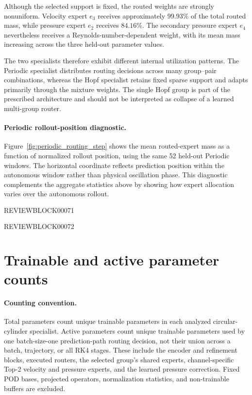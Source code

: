 \documentclass{article}
\begin{document}
Although the selected support is fixed, the routed weights are strongly nonuniform. Velocity expert $e_3$ receives approximately $99.93\%$ of the total routed mass, while pressure expert $e_2$ receives $84.16\%$. The secondary pressure expert $e_4$ nevertheless receives a Reynolds-number-dependent weight, with its mean mass increasing across the three held-out parameter values.

The two specialists therefore exhibit different internal utilization patterns. The Periodic specialist distributes routing decisions across many group--pair combinations, whereas the Hopf specialist retains fixed sparse support and adapts primarily through the mixture weights. The single Hopf group is part of the prescribed architecture and should not be interpreted as collapse of a learned multi-group router.

\paragraph{Periodic rollout-position diagnostic.}
Figure~\ref{fig:periodic_routing_step} shows the mean routed-expert mass as a function of normalized rollout position, using the same 52 held-out Periodic windows. The horizontal coordinate reflects prediction position within the
autonomous window rather than physical oscillation phase. This diagnostic complements the aggregate statistics above by showing how expert allocation varies over the autonomous rollout.


\par


REVIEWBLOCK00071


\par

\par


REVIEWBLOCK00072


\par

\clearpage
\section{Trainable and active parameter counts}
\label{app:parameter_counts}

\paragraph{Counting convention.}
Total parameters count unique trainable parameters in each analyzed
circular-cylinder specialist. Active parameters count unique trainable
parameters used by one batch-size-one prediction-path routing decision,
not their union across a batch, trajectory, or all RK4 stages. These include
the encoder and refinement blocks, executed routers, the selected group's
shared experts, channel-specific Top-2 velocity and pressure experts, and
the learned pressure correction. Fixed POD bases, projected operators,
normalization statistics, and non-trainable buffers are excluded.
\end{document}
